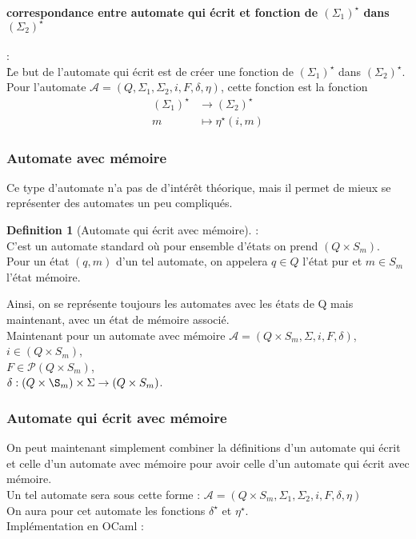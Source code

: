 \documentclass{article}
\theoremstyle{definition}
\newtheorem{definition}{Definition}[section]
\begin{document}
\paragraph{correspondance entre automate qui \'ecrit et fonction de $(\Sigma_1)^\star$ dans $(\Sigma_2)^\star$ }:\\
\`Le but de l'automate qui \'ecrit est de cr\'eer une fonction de $(\Sigma_1)^\star$ dans $(\Sigma_2)^\star$.\\
Pour l'automate $\mathcal{A} = (Q,\Sigma_1 ,\Sigma_2, i, F, \delta, \eta)$, cette fonction est la fonction
\begin{align*}
    (\Sigma_1)^\star &\rightarrow (\Sigma_2)^\star\\
    m &\mapsto \eta^\star(i,m)
\end{align*}
\subsubsection{Automate avec mémoire}
Ce type d'automate n'a pas de d'intérêt théorique, mais il permet de mieux se repr\'esenter des automates un peu compliqu\'es.
\begin{definition}[Automate qui écrit avec mémoire] :\\
C'est un automate standard o\`u pour ensemble d'\'etats on prend $(Q \times S_m)$. \\Pour un \'etat $(q,m)$ d'un tel automate, on appelera $q\in Q$ l'\'etat pur et $m\in S_m$ l'\'etat m\'emoire.
\end{definition}
Ainsi, on se repr\'esente toujours les automates avec les \'etats de Q mais maintenant, avec un \'etat de m\'emoire associ\'e.\\
Maintenant pour un automate avec m\'emoire $\mathcal{A} = (Q\times S_m,\Sigma, i, F, \delta)$,\\
$i\in (Q\times S_m)$,\\
$F \in \mathcal{P}(Q\times S_m)$,\\
$\delta : (Q\times \S_m) \times \Sigma \rightarrow (Q\times S_m)$.
\subsubsection{Automate qui \'ecrit avec m\'emoire}
On peut maintenant simplement combiner la d\'efinitions d'un automate qui \'ecrit et celle d'un automate avec m\'emoire pour avoir celle d'un automate qui \'ecrit avec m\'emoire.\\
Un tel automate sera sous cette forme : $\mathcal{A} = (Q\times S_m,\Sigma_1 ,\Sigma_2, i, F, \delta, \eta)$\\
On aura pour cet automate les fonctions $\delta^\star$ et $\eta^\star$.\\
Impl\'ementation en OCaml : \\
\end{document}
